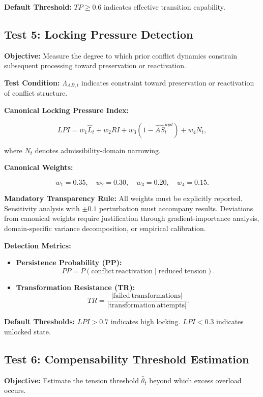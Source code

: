 \documentclass[11pt,a4paper]{article}
\theoremstyle{breakstyle}
\newcommand{\Lhat}{\widehat{L}}
\newcommand{\thetahat}{\widehat{\theta}}
\begin{document}
	\textbf{Default Threshold:} $TP \geq 0.6$ indicates effective transition capability.
	
	\subsection*{Test 5: Locking Pressure Detection}
	
	\textbf{Objective:} Measure the degree to which prior conflict dynamics constrain subsequent processing toward preservation or reactivation.
	
	\textbf{Test Condition:} $\Lambda_{AB,t}$ indicates constraint toward preservation or reactivation of conflict structure.
	
	\textbf{Canonical Locking Pressure Index:}
	
	\[
	LPI =
	w_1 \Lhat_t
	+
	w_2 RI
	+
	w_3(1-\widehat{AS}^{upd}_t)
	+
	w_4 N_t,
	\]
	
	where $N_t$ denotes admissibility-domain narrowing.
	
	\textbf{Canonical Weights:}
	
	\[
	w_1 = 0.35,\quad
	w_2 = 0.30,\quad
	w_3 = 0.20,\quad
	w_4 = 0.15.
	\]
	
	\textbf{Mandatory Transparency Rule:} All weights must be explicitly reported. Sensitivity analysis with $\pm 0.1$ perturbation must accompany results. Deviations from canonical weights require justification through gradient-importance analysis, domain-specific variance decomposition, or empirical calibration.
	
	\textbf{Detection Metrics:}
	\begin{itemize}
		\item \textbf{Persistence Probability (PP):}
		\[
		PP =
		P(\mathrm{conflict\ reactivation}
		\mid
		\mathrm{reduced\ tension}).
		\]
		
		\item \textbf{Transformation Resistance (TR):}
		\[
		TR =
		\frac{
			|\mathrm{failed\ transformations}|
		}{
			|\mathrm{transformation\ attempts}|
		}.
		\]
	\end{itemize}
	
	\textbf{Default Thresholds:} $LPI > 0.7$ indicates high locking. $LPI < 0.3$ indicates unlocked state.
	
	\subsection*{Test 6: Compensability Threshold Estimation}
	
	\textbf{Objective:} Estimate the tension threshold $\thetahat_t$ beyond which excess overload occurs.
	
\end{document}
